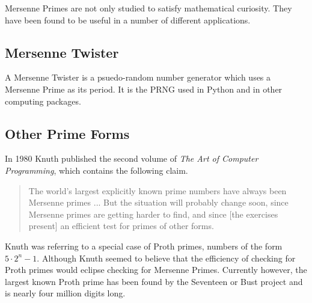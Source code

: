 Mersenne Primes are not only studied to satisfy mathematical curiosity.  They have been found to be useful in a number of different applications.  

\subsection{Mersenne Twister}
A Mersenne Twister is a psuedo-random number generator which uses a Mersenne Prime as
its period. It is the PRNG used in Python and in other computing packages.
\subsection{Other Prime Forms}
\label{sec:knuth}
In 1980 Knuth published the second volume of \emph{The Art of Computer Programming}, which contains the following claim.

\begin{quote}
The world’s largest explicitly known prime numbers have always been Mersenne primes ... But the situation will probably change soon, since Mersenne primes are getting harder to find, and since [the exercises present] an efficient test for primes of other forms. \cite{taocp}
\end{quote}

Knuth was referring to a special case of Proth primes, numbers of the form $5\cdot2^n-1$.
Although Knuth seemed to believe that the efficiency of checking for Proth primes would
eclipse checking for Mersenne Primes. Currently however, the largest known Proth prime has
been found by the Seventeen or Bust project and is nearly four million digits long.~\cite{seventeenorbust}

